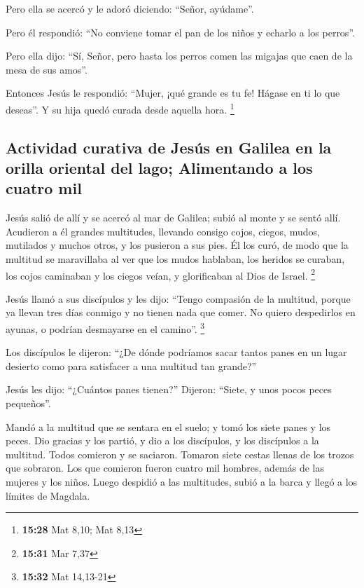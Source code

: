 \begin{paracol}{2}
 Pero ella se acercó y le adoró diciendo: ``Señor,
ayúdame''.

 Pero él respondió: ``No conviene tomar el pan de los
niños y echarlo a los perros''.

 Pero ella dijo: ``Sí, Señor, pero hasta los perros comen
las migajas que caen de la mesa de sus amos''.

 Entonces Jesús le respondió: ``Mujer, ¡qué grande es tu
fe! Hágase en ti lo que deseas''. Y su hija quedó curada desde aquella
hora. \footnote{\textbf{15:28} Mat 8,10; Mat 8,13}

\hypertarget{actividad-curativa-de-jesuxfas-en-galilea-en-la-orilla-oriental-del-lago-alimentando-a-los-cuatro-mil}{%
\subsection{Actividad curativa de Jesús en Galilea en la orilla oriental
del lago; Alimentando a los cuatro
mil}\label{actividad-curativa-de-jesuxfas-en-galilea-en-la-orilla-oriental-del-lago-alimentando-a-los-cuatro-mil}}

 Jesús salió de allí y se acercó al mar de Galilea; subió
al monte y se sentó allí.  Acudieron a él grandes
multitudes, llevando consigo cojos, ciegos, mudos, mutilados y muchos
otros, y los pusieron a sus pies. Él los curó,  de modo
que la multitud se maravillaba al ver que los mudos hablaban, los
heridos se curaban, los cojos caminaban y los ciegos veían, y
glorificaban al Dios de Israel. \footnote{\textbf{15:31} Mar 7,37}

 Jesús llamó a sus discípulos y les dijo: ``Tengo
compasión de la multitud, porque ya llevan tres días conmigo y no tienen
nada que comer. No quiero despedirlos en ayunas, o podrían desmayarse en
el camino''. \footnote{\textbf{15:32} Mat 14,13-21}

 Los discípulos le dijeron: ``¿De dónde podríamos sacar
tantos panes en un lugar desierto como para satisfacer a una multitud
tan grande?''

 Jesús les dijo: ``¿Cuántos panes tienen?'' Dijeron:
``Siete, y unos pocos peces pequeños''.

 Mandó a la multitud que se sentara en el suelo;
 y tomó los siete panes y los peces. Dio gracias y los
partió, y dio a los discípulos, y los discípulos a la multitud.
 Todos comieron y se saciaron. Tomaron siete cestas
llenas de los trozos que sobraron.  Los que comieron
fueron cuatro mil hombres, además de las mujeres y los niños.
 Luego despidió a las multitudes, subió a la barca y
llegó a los límites de Magdala.


\end{paracol}

